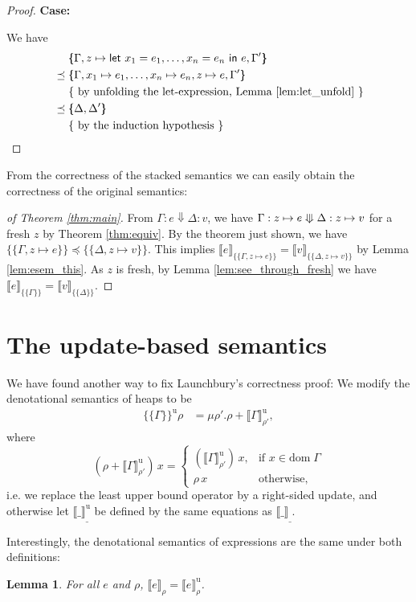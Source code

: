 \documentclass[twopage]{scrartcl}
\newtheorem{lemma}{Lemma}
\theoremstyle{nonumberbreak}
\newtheorem{proof}{Proof}
\newcommand{\sLet}[2]{\text{\textsf{let}}\ #1\ \text{\textsf{in}}\ #2}
\newcommand{\sred}[4]{#1 : #2 \Downarrow #3 : #4}
\newcommand{\ssred}[4]{#1 : #2 \mathrel{\rotatebox[origin=c]{90}{$\Lleftarrow$}} #3 : #4}
\newcommand{\sRule}[1]{\text{{\textsc{#1}}}}
\newcommand{\dom}[1]{\text{dom}\;#1}
\newcommand{\xeng}{x_1 = e_1, \ldots, x_n = e_n}
\newcommand{\xen}{x_1\mapsto e_1, \ldots, x_n\mapsto e_n}
\newcommand{\dsem}[2]{\llbracket #1 \rrbracket_{#2}}
\newcommand{\esem}[1]{\{\!\!\!\{#1\}\!\!\!\}}
\newcommand{\dsemu}[2]{\llbracket #1 \rrbracket^{\text{u}}_{#2}}
\newcommand{\esemu}[1]{\{\!\!\!\{#1\}\!\!\!\}^{\text{u}}}
\newcommand{\case}[1]{\par\smallskip\noindent\textbf{Case:} #1\nopagebreak\par\noindent\ignorespaces}
\newcommand{\beginright}{&\mathrel{\phantom{=}}}
\newcommand{\aexpl}[1]{&\mathrel{\phantom{=}}\left\{\text{ #1 }\right\}}
\begin{document}
\begin{proof}
\case{\sRule{Let}}
We have
\begin{align*}
\beginright
\esem{\Gamma,z \mapsto \sLet{\xeng}e, \Gamma'}\\
&\preceq \esem{\Gamma,\xen, z \mapsto e, \Gamma'} \\
\aexpl{by unfolding the let-expression, Lemma \ref{lem:let_unfold}} \\
&\preceq \esem{\Delta,\Delta'}\\
\aexpl{by the induction hypothesis}
\end{align*}
\end{proof}

From the correctness of the stacked semantics we can easily obtain the correctness of the original semantics:

\begin{proof}[of Theorem \ref{thm:main}]
From $\sred \Gamma e \Delta v$, we have $\ssred{\Gamma}{z \mapsto e}{\Delta}{z\mapsto v}$ for a fresh $z$ by Theorem \ref{thm:equiv}. By the theorem just shown, we have $\esem{\Gamma, z \mapsto e} \preceq \esem{\Delta, z\mapsto v}$. This implies $\dsem{e}{\esem{\Gamma, z \mapsto e}} = \dsem{v}{\esem{\Delta, z\mapsto v}}$ by Lemma \ref{lem:esem_this}. As $z$ is fresh, by Lemma \ref{lem:see_through_fresh} we have $\dsem{e}{\esem{\Gamma}} = \dsem{v}{\esem{\Delta}}$.
\end{proof}

\section{The update-based semantics}
\label{updsemantics}

We have found another way to fix Launchbury's correctness proof: We modify the denotational semantics of heaps to be
\begin{align*}
\esemu{ \Gamma }\rho &= \mu \rho'. \rho + \dsemu{\Gamma}{\rho'},
\end{align*}
where
\[
(\rho + \dsemu{\Gamma}{\rho'})\, x = 
\begin{cases}
(\dsemu{\Gamma}{\rho'})\, x, &\text{if } x \in \dom \Gamma\\
\rho\, x &\text{otherwise},
\end{cases}
\]
i.e. we replace the least upper bound operator by a right-sided update, and otherwise let $\dsemu{\_}\_$ be defined by the same equations as $\dsem{\_}\_$.

Interestingly, the denotational semantics of expressions are the same under both definitions:
\begin{lemma}
For all $e$ and $\rho$, $\dsem{e}{\rho} = \dsemu{e}{\rho}$.
\label{lem:deneq}
\end{lemma}
\end{document}
